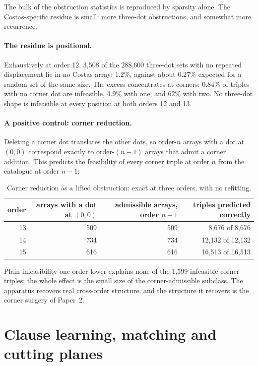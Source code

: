 \documentclass[11pt,a4paper,oneside]{report}
\theoremstyle{definition}
\begin{document}
\noindent The bulk of the obstruction statistics is reproduced by sparsity alone. The Costas-specific residue
is small: more three-dot obstructions, and somewhat more recurrence.

\paragraph{The residue is positional.} Exhaustively at order 12, 3{,}508 of the 288{,}600 three-dot sets with no
repeated displacement lie in no Costas array: $1.2\%$, against about $0.27\%$ expected for a random set of the
same size. The excess concentrates at corners: $0.84\%$ of triples with no corner dot are infeasible, $4.9\%$
with one, and $62\%$ with two. No three-dot shape is infeasible at every position at both orders 12 and 13.

\paragraph{A positive control: corner reduction.} Deleting a corner dot translates the other dots, so order-$n$
arrays with a dot at $(0,0)$ correspond exactly to order-$(n-1)$ arrays that admit a corner addition. This
predicts the feasibility of every corner triple at order $n$ from the catalogue at order $n-1$:

\begin{table}[H]
\centering
\small
\begin{tabular}{@{}rrrr@{}}
\toprule
order & arrays with a dot at $(0,0)$ & admissible arrays, order $n-1$ & triples predicted correctly \\
\midrule
13 & 509 & 509 & 8{,}676 of 8{,}676 \\
14 & 734 & 734 & 12{,}132 of 12{,}132 \\
15 & 616 & 616 & 16{,}513 of 16{,}513 \\
\bottomrule
\end{tabular}
\caption{Corner reduction as a lifted obstruction: exact at three orders, with no refitting.}
\label{p10-tab:corner}
\end{table}

\noindent Plain infeasibility one order lower explains none of the 1{,}599 infeasible corner triples; the whole
effect is the small size of the corner-admissible subclass. The apparatus recovers real cross-order
structure, and the structure it recovers is the corner surgery of Paper~2.

\section{Clause learning, matching and cutting planes}
\label{p10-sec:proofs}
\end{document}
